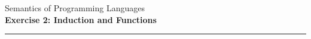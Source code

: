 \documentclass[10pt,a4paper]{exam}
\begin{document}
\newcommand{\course}{Semantics of Programming Languages}
\newcommand{\week}{2}
\newcommand{\topics}{Induction and Functions}

\everymath{\color{campurpledark}}
\everydisplay{\color{campurpledark}}




\marksnotpoints
\pointsdroppedatright
\marksnotpoints
\marginpointname{ \points}

\begin{center}
\Large {\color{campurpledark} \course} \\[-0.2cm]
\LARGE \textbf{\color{campurpledark} Exercise \week: \topics} \\
\end{center}

{\color{campurple}\hrule}

\newcommand{\metavar}[1]{{\color{campurple}#1}}
\end{document}
